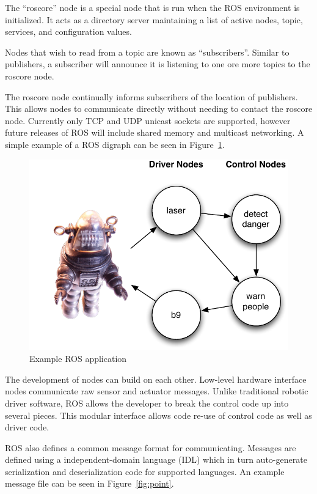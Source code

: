 The ``roscore'' node is a special node that is run when the ROS environment is initialized. It acts as a directory server maintaining a list of active nodes, topic, services, and configuration values.

Nodes that wish to read from a topic are known as ``subscribers''. Similar to publishers, a subscriber will announce it is listening to one ore more topics to the roscore node.

The roscore node continually informs subscribers of the location of publishers. This allows nodes to communicate directly without needing to contact the roscore node. Currently only TCP and UDP unicast sockets are supported, however future releases of ROS will include shared memory and multicast networking. A simple example of a ROS digraph can be seen in Figure~\ref{fig:middleware-ros}.

\begin{figure}[ht]
\includegraphics{images/middleware-ros.pdf}
\caption{Example ROS application\label{fig:middleware-ros}}
\end{figure}

The development of nodes can build on each other. Low-level hardware interface nodes communicate raw sensor and actuator messages. Unlike traditional robotic driver software, ROS allows the developer to break the control code up into several pieces. This modular interface allows code re-use of control code as well as driver code.

ROS also defines a common message format for communicating. Messages are defined using a independent-domain language (IDL) which in turn auto-generate serialization and deserialization code for supported languages. An example message file can be seen in Figure~\ref{fig:point}.

